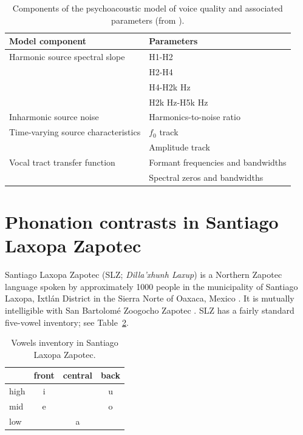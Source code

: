 \documentclass[12pt, letterpaper]{article}
\providecommand{\lsptoprule}{\midrule\toprule}
\providecommand{\lspbottomrule}{\bottomrule\midrule}
\begin{document}
\begin{table}[!h]
    \centering
    \caption{Components of the psychoacoustic model of voice quality and associated parameters (from \cite{kreimanUnifiedTheoryVoice2014}).}
    \label{tab:Kreiman}
    \begin{tabular}{ll}
    \lsptoprule
    Model component & Parameters \\
    \hline
    Harmonic source spectral slope      & H1-H2 \\
                                        & H2-H4 \\
	                                & H4-H2k Hz \\
	                                & H2k Hz-H5k Hz \\
    Inharmonic source noise             & Harmonics-to-noise ratio \\
    Time-varying source characteristics & $f_0$ track \\
	                                & Amplitude track \\
    Vocal tract transfer function       & Formant frequencies and bandwidths \\
	                                & Spectral zeros and bandwidths\\
    \lspbottomrule
    \end{tabular}
\end{table}


\section{Phonation contrasts in Santiago Laxopa Zapotec} \label{sec:SLZ}

Santiago Laxopa Zapotec (SLZ; \textit{Dilla'xhunh Laxup}) is a Northern Zapotec language spoken by approximately 1000 people in the municipality of Santiago Laxopa, Ixtlán District in the Sierra Norte of Oaxaca, Mexico \citep{adlerAcousticsPhonationTypes2016,adlerDerivationVerbInitiality2018,foleyForbiddenCliticClusters2018,foleyExtendingPersonCaseConstraint2020}. It is mutually intelligible with San Bartolomé Zoogocho Zapotec \citep{longDiccionarioZapotecoSan2005,sonnenscheinDescriptiveGrammarSan2005}. SLZ has a fairly standard five-vowel inventory; see Table~\ref{tab:SLZvowels}.

\begin{table}[!h]
\centering
\caption{Vowels inventory in Santiago Laxopa Zapotec.}
\label{tab:SLZvowels}
    \begin{tabular}{lccc}
    \lsptoprule
	&  front& central  & back \\
    \midrule
    high   	&  i  &     &   u \\
    mid    	&  e  &   	& 	o \\
    low   	&     &  a 	&	  \\
    \lspbottomrule
    \end{tabular}
\end{table}
		
\end{document}
